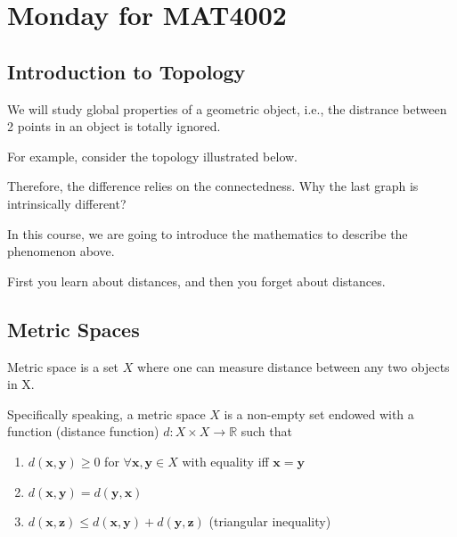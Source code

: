 \section{Monday for MAT4002}

\subsection{Introduction to Topology}
We will study global properties of a geometric object, i.e., the distrance between 2 points in an object is totally ignored.

For example, consider the topology illustrated below. 

Therefore, the difference relies on the connectedness. Why the last graph is intrinsically different?  

In this course, we are going to introduce the mathematics to describe the phenomenon above.

First you learn about distances, and then you forget about distances.
\subsection{Metric Spaces}
\begin{definition}
Metric space is a set $X$ where one can measure distance between any two objects in X.

Specifically speaking, a metric space $X$ is a non-empty set endowed with a function (distance function) $d:X\times X\to\mathbb{R}$ such that
\begin{enumerate}
\item
$d(\bm x,\bm y)\ge0$ for $\forall\bm x,\bm y\in X$ with equality iff $\bm x=\bm y$
\item
$d(\bm x,\bm y)=d(\bm y,\bm x)$
\item
$d(\bm x,\bm z)\le d(\bm x,\bm y)+d(\bm y,\bm z)$ (triangular inequality)
\end{enumerate}
\end{definition}

